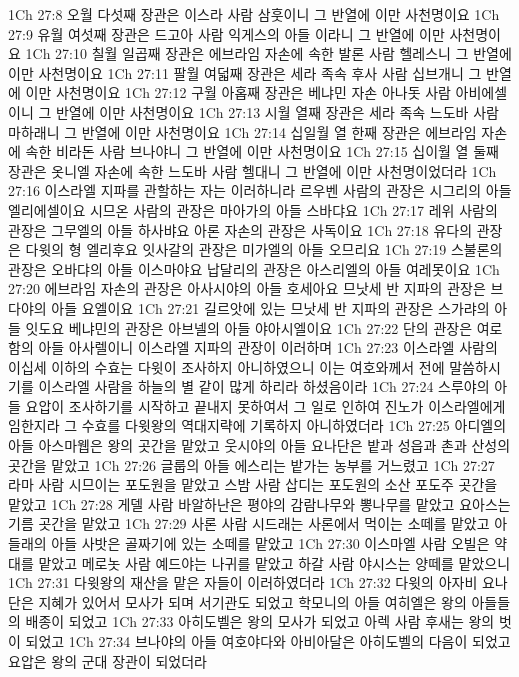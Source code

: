 1Ch 27:8  오월 다섯째 장관은 이스라 사람 삼훗이니 그 반열에 이만 사천명이요
1Ch 27:9  유월 여섯째 장관은 드고아 사람 익게스의 아들 이라니 그 반열에 이만 사천명이요
1Ch 27:10  칠월 일곱째 장관은 에브라임 자손에 속한 발론 사람 헬레스니 그 반열에 이만 사천명이요
1Ch 27:11  팔월 여덟째 장관은 세라 족속 후사 사람 십브개니 그 반열에 이만 사천명이요
1Ch 27:12  구월 아홉째 장관은 베냐민 자손 아나돗 사람 아비에셀이니 그 반열에 이만 사천명이요
1Ch 27:13  시월 열째 장관은 세라 족속 느도바 사람 마하래니 그 반열에 이만 사천명이요
1Ch 27:14  십일월 열 한째 장관은 에브라임 자손에 속한 비라돈 사람 브나야니 그 반열에 이만 사천명이요
1Ch 27:15  십이월 열 둘째 장관은 옷니엘 자손에 속한 느도바 사람 헬대니 그 반열에 이만 사천명이었더라
1Ch 27:16  이스라엘 지파를 관할하는 자는 이러하니라 르우벤 사람의 관장은 시그리의 아들 엘리에셀이요 시므온 사람의 관장은 마아가의 아들 스바댜요
1Ch 27:17  레위 사람의 관장은 그무엘의 아들 하사뱌요 아론 자손의 관장은 사독이요
1Ch 27:18  유다의 관장은 다윗의 형 엘리후요 잇사갈의 관장은 미가엘의 아들 오므리요
1Ch 27:19  스불론의 관장은 오바댜의 아들 이스마야요 납달리의 관장은 아스리엘의 아들 여레못이요
1Ch 27:20  에브라임 자손의 관장은 아사시야의 아들 호세아요 므낫세 반 지파의 관장은 브다야의 아들 요엘이요
1Ch 27:21  길르앗에 있는 므낫세 반 지파의 관장은 스가랴의 아들 잇도요 베냐민의 관장은 아브넬의 아들 야아시엘이요
1Ch 27:22  단의 관장은 여로함의 아들 아사렐이니 이스라엘 지파의 관장이 이러하며
1Ch 27:23  이스라엘 사람의 이십세 이하의 수효는 다윗이 조사하지 아니하였으니 이는 여호와께서 전에 말씀하시기를 이스라엘 사람을 하늘의 별 같이 많게 하리라 하셨음이라
1Ch 27:24  스루야의 아들 요압이 조사하기를 시작하고 끝내지 못하여서 그 일로 인하여 진노가 이스라엘에게 임한지라 그 수효를 다윗왕의 역대지략에 기록하지 아니하였더라
1Ch 27:25  아디엘의 아들 아스마웹은 왕의 곳간을 맡았고 웃시야의 아들 요나단은 밭과 성읍과 촌과 산성의 곳간을 맡았고
1Ch 27:26  글룹의 아들 에스리는 밭가는 농부를 거느렸고
1Ch 27:27  라마 사람 시므이는 포도원을 맡았고 스밤 사람 삽디는 포도원의 소산 포도주 곳간을 맡았고
1Ch 27:28  게델 사람 바알하난은 평야의 감람나무와 뽕나무를 맡았고 요아스는 기름 곳간을 맡았고
1Ch 27:29  사론 사람 시드래는 사론에서 먹이는 소떼를 맡았고 아들래의 아들 사밧은 골짜기에 있는 소떼를 맡았고
1Ch 27:30  이스마엘 사람 오빌은 약대를 맡았고 메로놋 사람 예드야는 나귀를 맡았고 하갈 사람 야시스는 양떼를 맡았으니
1Ch 27:31  다윗왕의 재산을 맡은 자들이 이러하였더라
1Ch 27:32  다윗의 아자비 요나단은 지혜가 있어서 모사가 되며 서기관도 되었고 학모니의 아들 여히엘은 왕의 아들들의 배종이 되었고
1Ch 27:33  아히도벨은 왕의 모사가 되었고 아렉 사람 후새는 왕의 벗이 되었고
1Ch 27:34  브나야의 아들 여호야다와 아비아달은 아히도벨의 다음이 되었고 요압은 왕의 군대 장관이 되었더라
